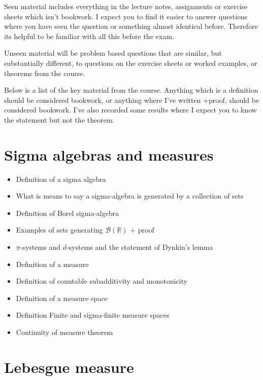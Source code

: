 \documentclass[
]{book}
\providecommand{\tightlist}{%
  \setlength{\itemsep}{0pt}\setlength{\parskip}{0pt}}
\theoremstyle{definition}
\theoremstyle{definition}
\theoremstyle{definition}
\theoremstyle{definition}
\theoremstyle{remark}
\begin{document}
Seen material includes everything in the lecture notes, assignments or exercise sheets which isn't bookwork. I expect you to find it easier to answer questions where you have seen the question or something almost identical before. Therefore its helpful to be familiar with all this before the exam.

Unseen material will be problem based questions that are similar, but substantially different, to questions on the exercise sheets or worked examples, or theorems from the course.

Below is a list of the key material from the course. Anything which is a definition should be considered bookwork, or anything where I've written +proof, should be considered bookwork. I've also recorded some results where I expect you to know the statement but not the theorem.

\hypertarget{sigma-algebras-and-measures}{%
\section{Sigma algebras and measures}\label{sigma-algebras-and-measures}}

\begin{itemize}
\tightlist
\item
  Definition of a sigma algebra
\item
  What is means to say a sigma-algebra is generated by a collection of sets
\item
  Definition of Borel sigma-algebra
\item
  Examples of sets generating \(\mathcal{B}(\mathbb{R})\) + proof
\item
  \(\pi\)-systems and \(d\)-systems and the statement of Dynkin's lemma
\item
  Definition of a measure
\item
  Definition of countable subadditivity and monotonicity
\item
  Definition of a measure space
\item
  Definition Finite and sigma-finite measure spaces
\item
  Continuity of measure theorem
\end{itemize}

\hypertarget{lebesgue-measure}{%
\section{Lebesgue measure}\label{lebesgue-measure}}
\end{document}
